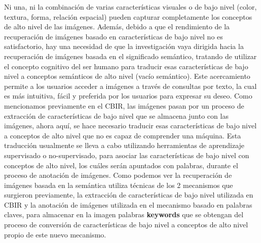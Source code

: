 \documentclass{llncs}
\begin{document}
Ni una, ni la combinación de varias características visuales o de bajo nivel (color, textura, forma, relación espacial) pueden capturar 
completamente los conceptos de alto nivel de las imágenes. Además, debido a que el rendimiento de la recuperación de imágenes basado en 
características de bajo nivel no es satisfactorio, hay una necesidad de que la investigación vaya dirigida hacia la recuperación de 
imágenes basada en el significado semántico, tratando de utilizar el concepto cognitivo del ser humano para traducir esas 
características de bajo nivel a conceptos semánticos de alto nivel (vacío semántico). Este acercamiento permite a los usuarios 
acceder a imágenes a través de consultas por texto, la cual es más intuitiva, fácil y preferida por los usuarios para expresar 
su deseo. Como mencionamos previamente en el CBIR, las imágenes pasan por un proceso de extracción de características de bajo nivel que 
se almacena junto con las imágenes, ahora aquí, se hace necesario traducir esas características de bajo nivel a conceptos de alto nivel 
que no es capaz de comprender una máquina. Esta traducción usualmente se lleva a cabo utilizando herramientas de aprendizaje supervisado 
o no-supervisado, para asociar las características de bajo nivel con conceptos de alto nivel, los cuáles serán apuntados con palabras, 
durante el proceso de anotación de imágenes.
Como podemos ver la recuperación de imágenes basada en la semántica utiliza técnicas de los 2 mecanismos que surgieron previamente, 
la extracción de características de bajo nivel utilizada en CBIR y la anotación de imágenes utilizada en el mecanismo basado en 
palabras claves, para almacenar en la imagen palabras \textbf{keywords} que se obtengan del proceso de conversión de características de 
bajo nivel a conceptos de alto nivel propio de este nuevo mecanismo.
\end{document}
